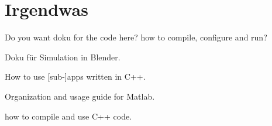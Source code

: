 \chapter{Irgendwas}
\label{sec:irgendwas}

Do you want doku for the code here? how to compile, configure and run?

Doku für Simulation in Blender.

How to use [sub-]apps written in C++.

Organization and usage guide for Matlab.

how to compile and use C++ code.

